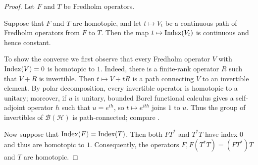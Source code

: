 \documentclass{book}
\def\Index{\textnormal{Index}}
\begin{document}
\begin{proof}
   Let \(F\) and \(T\) be Fredholm operators.\par
Suppose that \(F\) and \(T\) are homotopic, and let \(t \mapsto V_t\) be a continuous path of Fredholm
operators from \(F\) to \(T\). Then the map \(t \mapsto \Index(V_t)\) is continuous and hence constant.\par
To show the converse we first observe that every Fredholm operator \(V\) with \(\Index(V ) =
  0\) is homotopic to \(1\). Indeed, there is a finite-rank operator \(R\) such that \(V+R\) is invertible.
 Then \(t \mapsto V +tR\) is a path connecting \(V\) to an invertible element. By polar decomposition,
 every invertible operator is homotopic to a unitary; moreover, if \(u\) is unitary, bounded Borel functional
 calculus gives a self-adjoint operator \(h\) such that \(u=e^{ih}\), so \(t\mapsto e^{ith}\) joins \(1\) to
 \(u\). Thus the group of invertibles of \(\mathcal{B}(\mathcal{H})\) is path-connected; compare
 \cite[Example~8.1.8]{RordamLarsenLaustsen2000}.\par
Now suppose that \(\Index(F) = \Index(T)\). Then both \(FT^*\) and \(T^*T\) have index \(0\) and
thus are homotopic to \(1\). Consequently, the operators \(F, F(T^*T) = (FT^*)T\) and \(T\) are
homotopic.
\end{proof}
\end{document}
